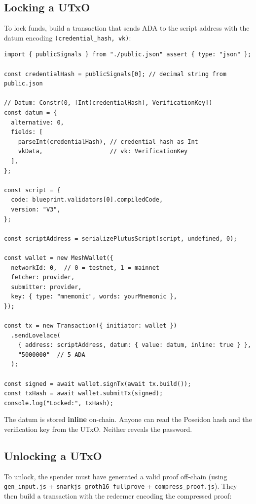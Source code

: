 \subsection*{Locking a UTxO}

To lock funds, build a transaction that sends ADA to the script address with
the datum encoding \texttt{(credential\_hash, vk)}:

\begin{verbatim}
import { publicSignals } from "./public.json" assert { type: "json" };

const credentialHash = publicSignals[0]; // decimal string from public.json

// Datum: Constr(0, [Int(credentialHash), VerificationKey])
const datum = {
  alternative: 0,
  fields: [
    parseInt(credentialHash), // credential_hash as Int
    vkData,                   // vk: VerificationKey
  ],
};

const script = {
  code: blueprint.validators[0].compiledCode,
  version: "V3",
};

const scriptAddress = serializePlutusScript(script, undefined, 0);

const wallet = new MeshWallet({
  networkId: 0,  // 0 = testnet, 1 = mainnet
  fetcher: provider,
  submitter: provider,
  key: { type: "mnemonic", words: yourMnemonic },
});

const tx = new Transaction({ initiator: wallet })
  .sendLovelace(
    { address: scriptAddress, datum: { value: datum, inline: true } },
    "5000000"  // 5 ADA
  );

const signed = await wallet.signTx(await tx.build());
const txHash = await wallet.submitTx(signed);
console.log("Locked:", txHash);
\end{verbatim}

\begin{highlight}
The datum is stored \textbf{inline} on-chain. Anyone can read the Poseidon
hash and the verification key from the UTxO. Neither reveals the password.
\end{highlight}

\subsection*{Unlocking a UTxO}

To unlock, the spender must have generated a valid proof off-chain
(using \texttt{gen\_input.js} + \texttt{snarkjs groth16 fullprove} +
\texttt{compress\_proof.js}). They then build a transaction with the redeemer
encoding the compressed proof:

